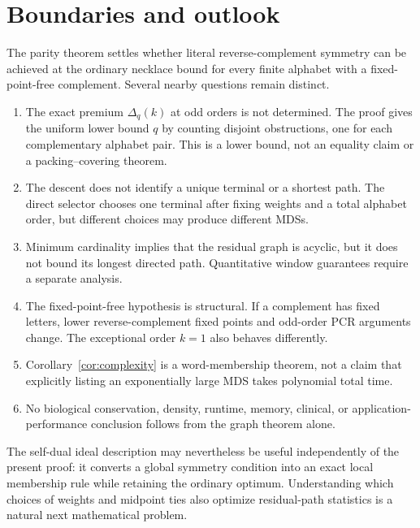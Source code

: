 \section{Boundaries and outlook}
\label{sec:outlook}

The parity theorem settles whether literal reverse-complement symmetry can be
achieved at the ordinary necklace bound for every finite alphabet with a
fixed-point-free complement.  Several nearby questions remain distinct.

\begin{enumerate}
  \item The exact premium $\Delta_q(k)$ at odd orders is not determined.
  The proof gives the uniform lower bound $q$ by counting disjoint
  obstructions, one for each complementary alphabet pair. This is a lower
  bound, not an equality claim or a packing--covering theorem.

  \item The descent does not identify a unique terminal or a shortest path.
  The direct selector chooses one terminal after fixing weights and a total
  alphabet order, but different choices may produce different MDSs.

  \item Minimum cardinality implies that the residual graph is acyclic, but
  it does not bound its longest directed path.  Quantitative window guarantees
  require a separate analysis.

  \item The fixed-point-free hypothesis is structural.  If a complement has
  fixed letters, lower reverse-complement fixed points and odd-order PCR
  arguments change.  The exceptional order $k=1$ also behaves differently.

  \item Corollary~\ref{cor:complexity} is a word-membership theorem, not a
  claim that explicitly listing an exponentially large MDS takes polynomial
  total time.

  \item No biological conservation, density, runtime, memory, clinical, or
  application-performance conclusion follows from the graph theorem alone.
\end{enumerate}

The self-dual ideal description may nevertheless be useful independently of
the present proof: it converts a global symmetry condition into an exact
local membership rule while retaining the ordinary optimum.  Understanding
which choices of weights and midpoint ties also optimize residual-path
statistics is a natural next mathematical problem.


